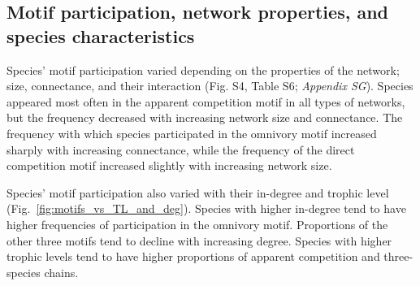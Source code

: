 \documentclass[12pt]{article}
\begin{document}
\begin{spacing}{2.0}
    
    \clearpage
    
    \subsection*{Motif participation, network properties, and species characteristics}

       Species' motif participation varied depending on the properties of the network; size, connectance, and their interaction (Fig. S4, Table S6; \emph{Appendix SG}).
        Species appeared most often in the apparent competition motif in all types of networks, but the frequency decreased with increasing network size and connectance.
        The frequency with which species participated in the omnivory motif increased sharply with increasing connectance, while the frequency of the direct competition motif increased slightly with increasing network size. 
        
        Species' motif participation also varied with their in-degree and trophic level (Fig.~\ref{fig:motifs_vs_TL_and_deg}).
        Species with higher in-degree tend to have higher frequencies of participation in the omnivory motif. Proportions of the other three motifs tend to decline with increasing degree.
        Species with higher trophic levels tend to have higher proportions of apparent competition and three-species chains. 
        


\end{spacing}
\end{document}
